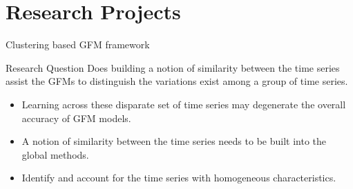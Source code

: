 \documentclass{beamer}
\begin{document}
 
\section{Research Projects}

    
\begin{frame}{Clustering based GFM framework}
   \begin{block}{Research Question}	
	Does building a notion of similarity between the time series assist the GFMs to distinguish the variations exist among a group of time series.
	\end{block}
	\vspace{0.8mm}
	\begin{itemize}
	\item Learning across these disparate set of time series may degenerate the overall accuracy of GFM models.
	\item A notion of similarity between the time series needs to be built into the global methods.
	\item Identify and account for the time series with homogeneous characteristics.
	\end{itemize}
\end{frame}  
\end{document}
